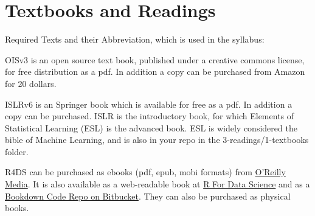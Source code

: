 \documentclass[11pt]{article} %
\begin{document}

\section{Textbooks and Readings}

Required Texts and their Abbreviation, which is used in the syllabus: 
	
OISv3 is an open source text book, published under a creative commons license, for free distribution as a pdf. 
In addition a copy can be purchased from Amazon for 20 dollars. 

ISLRv6 is an Springer book which is available for free as a pdf. 
In addition a copy can be purchased. 
ISLR is the introductory book, for which Elements of Statistical Learning (ESL) is the advanced book.  ESL is widely considered the bible of Machine Learning, and is also in your repo in the 3-readings/1-textbooks folder.

R4DS can be purchased as ebooks (pdf, epub, mobi formats) from  \href{"http://www.oreilly.com/"}{O'Reilly Media}. 
It is also available as a web-readable book at \href{http://r4ds.had.co.nz/}{R For Data Science} and as a \href{https://bitbucket.org/cwrudsci/r4ds}{Bookdown Code Repo on Bitbucket}. 
They can also be purchased as physical books.   
\end{document}
